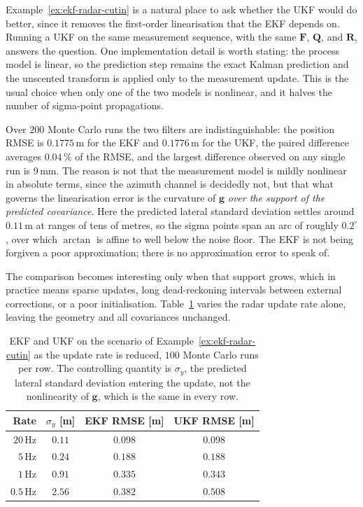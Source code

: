 \begin{example}
\label{ex:ukf-radar-cutin}
Example~\ref{ex:ekf-radar-cutin} is a natural place to ask whether the UKF
would do better, since it removes the first-order linearisation that the EKF
depends on. Running a UKF on the same measurement sequence, with the same
$\mathbf{F}$, $\mathbf{Q}$, and $\mathbf{R}$, answers the question. One
implementation detail is worth stating: the process model is linear, so the
prediction step remains the exact Kalman prediction and the unscented transform
is applied only to the measurement update. This is the usual choice when only
one of the two models is nonlinear, and it halves the number of sigma-point
propagations.

Over $200$ Monte Carlo runs the two filters are indistinguishable: the position
RMSE is $0.1775$\,m for the EKF and $0.1776$\,m for the UKF, the paired
difference averages $0.04\,\%$ of the RMSE, and the largest difference observed
on any single run is $9$\,mm. The reason is not that the measurement model is
mildly nonlinear in absolute terms, since the azimuth channel is decidedly not,
but that what governs the linearisation error is the curvature of
$\mathbf{g}$ \emph{over the support of the predicted covariance}. Here the
predicted lateral standard deviation settles around $0.11$\,m at ranges of tens
of metres, so the sigma points span an arc of roughly $0.2^{\circ}$, over which
$\arctan$ is affine to well below the noise floor. The EKF is not being
forgiven a poor approximation; there is no approximation error to speak of.

The comparison becomes interesting only when that support grows, which in
practice means sparse updates, long dead-reckoning intervals between external
corrections, or a poor initialisation. Table~\ref{tab:ekf-ukf-rate} varies the
radar update rate alone, leaving the geometry and all covariances unchanged.

\begin{table}[!t]
\centering
\small
\caption{EKF and UKF on the scenario of
Example~\ref{ex:ekf-radar-cutin} as the update rate is reduced, $100$ Monte
Carlo runs per row. The controlling quantity is $\sigma_y$, the predicted
lateral standard deviation entering the update, not the nonlinearity of
$\mathbf{g}$, which is the same in every row.}
\label{tab:ekf-ukf-rate}
\begin{tabular}{r c c c}
\hline
\textbf{Rate} & \textbf{$\sigma_y$ [m]} & \textbf{EKF RMSE [m]} & \textbf{UKF RMSE [m]}\\
\hline
$20$\,Hz  & $0.11$ & $0.098$ & $0.098$\\
$5$\,Hz   & $0.24$ & $0.188$ & $0.188$\\
$1$\,Hz   & $0.91$ & $0.335$ & $0.343$\\
$0.5$\,Hz & $2.56$ & $0.382$ & $0.508$\\
\hline
\end{tabular}
\end{table}


\end{example}
